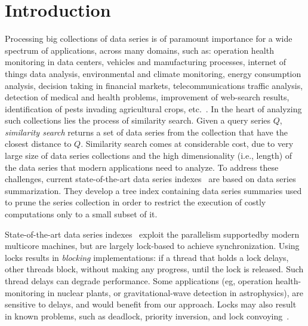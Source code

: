 \chapter{Introduction}
\label{chapter:introduction}

Processing big collections of data series is of paramount importance 
for a wide spectrum of applications, across many domains, such as: operation health
monitoring in data centers, vehicles and manufacturing processes, internet of things data
analysis, environmental and climate monitoring, energy consumption analysis, decision taking
in financial markets, telecommunications traffic analysis, detection of medical and health problems,
improvement of web-search results, identification of pests invading agricultural crops,
etc.~\cite{DBLP:journals/sigmod/Palpanas15,DBLP:journals/dagstuhl-reports/BagnallCPZ19,Palpanas2019}.
In the heart of analyzing such collections 
lies the process of similarity search. 
Given a query series $Q$, {\em similarity search} 
returns a set of data series from the collection that have the closest 
distance to $Q$. Similarity search comes at considerable cost, 
due to very large size of data series collections and the
high dimensionality (i.e., length) of the data series that modern applications need to analyze. 
To address these challenges, current state-of-the-art data series 
indexes~\cite{DBLP:journals/pvldb/EchihabiZPB18,isax2plus,wang2013data,peng2018paris,parisplus,peng2020messi,PFP21-I,PFP21-II,hercules,dumpy}
are based on data series summarization. They develop a tree index containing
data series summaries used to prune the series collection in order to
restrict the execution of costly computations only to a small subset of it.

State-of-the-art data series indexes~\cite{DBLP:journals/pvldb/EchihabiZPB18,isaxfamily,peng2018paris,peng2020messi,PFP21-I,PFP21-II,hercules} 
exploit the parallelism supportedby modern multicore machines,  
but are largely lock-based to achieve synchronization. 
Using locks results in {\em blocking} implementations: if a thread that
holds a lock delays, other threads block, without making any progress,  
until the lock is released. Such thread delays  can degrade performance. 
Some applications (eg, operation health-monitoring in nuclear plants, or gravitational-wave
detection in astrophysics), are sensitive to delays, and would benefit from our approach.
Locks may also result in known problems, such as deadlock, priority inversion,
and lock convoying~\cite{F04}.

